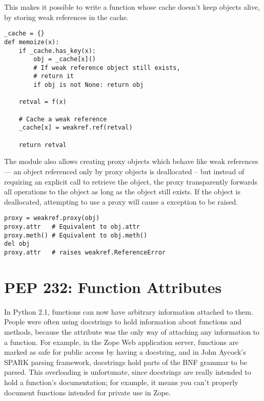 \documentclass{howto}
\begin{document}
This makes it possible to write a  function whose
cache doesn't keep objects alive, by storing weak references in the
cache.

\begin{verbatim}
_cache = {}
def memoize(x):
    if _cache.has_key(x):
        obj = _cache[x]()
        # If weak reference object still exists,
        # return it
        if obj is not None: return obj
 
    retval = f(x)

    # Cache a weak reference
    _cache[x] = weakref.ref(retval)

    return retval
\end{verbatim}

The  module also allows creating proxy objects which
behave like weak references --- an object referenced only by proxy
objects is deallocated -- but instead of requiring an explicit call to
retrieve the object, the proxy transparently forwards all operations
to the object as long as the object still exists.  If the object is
deallocated, attempting to use a proxy will cause a
 exception to be raised.

\begin{verbatim}
proxy = weakref.proxy(obj)
proxy.attr   # Equivalent to obj.attr
proxy.meth() # Equivalent to obj.meth()
del obj
proxy.attr   # raises weakref.ReferenceError
\end{verbatim}

\begin{seealso}


\end{seealso}

\section{PEP 232: Function Attributes}

In Python 2.1, functions can now have arbitrary information attached
to them.  People were often using docstrings to hold information about
functions and methods, because the  attribute was the
only way of attaching any information to a function.  For example, in
the Zope Web application server, functions are marked as safe for
public access by having a docstring, and in John Aycock's SPARK
parsing framework, docstrings hold parts of the BNF grammar to be
parsed.  This overloading is unfortunate, since docstrings are really
intended to hold a function's documentation; for example, it means you
can't properly document functions intended for private use in Zope.
\end{document}
